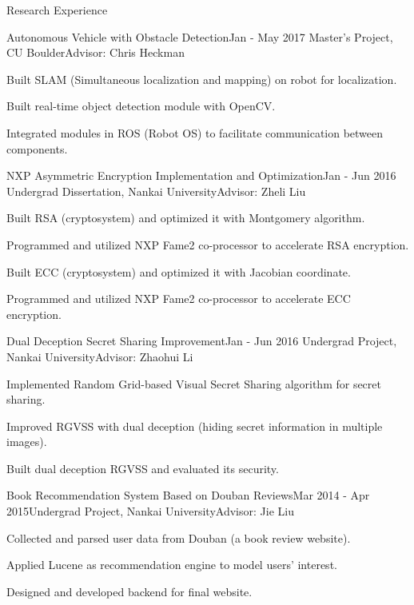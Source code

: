 \documentclass{resume} %
\begin{document}
\begin{rSection}{Research Experience}
\begin{rSubsection}{Autonomous Vehicle with Obstacle Detection}{Jan - May 2017 }{Master's Project, CU Boulder}{Advisor: Chris Heckman}
\item Built SLAM (Simultaneous localization and mapping) on robot for localization.
\item Built real-time object detection module with OpenCV.
\item Integrated modules in ROS (Robot OS) to facilitate communication between components.
\end{rSubsection}

\begin{rSubsection}{NXP Asymmetric Encryption Implementation and Optimization}{Jan - Jun 2016 }{Undergrad Dissertation, Nankai University}{Advisor: Zheli Liu}
\item Built RSA (cryptosystem) and optimized it with Montgomery algorithm.
\item Programmed and utilized NXP Fame2 co-processor to accelerate RSA encryption.
\item Built ECC (cryptosystem) and optimized it with Jacobian coordinate.
\item Programmed and utilized NXP Fame2 co-processor to accelerate ECC encryption.
\end{rSubsection}

\begin{rSubsection}{Dual Deception Secret Sharing Improvement}{Jan - Jun 2016 }{Undergrad Project, Nankai University}{Advisor: Zhaohui Li}
\item Implemented Random Grid-based Visual Secret Sharing algorithm for secret sharing.
\item Improved RGVSS with dual deception (hiding secret information in multiple images).
\item Built dual deception RGVSS and evaluated its security.
\end{rSubsection}

\begin{rSubsection}{Book Recommendation System Based on Douban Reviews}{Mar 2014 - Apr 2015}{Undergrad Project, Nankai University}{Advisor: Jie Liu}
\item Collected and parsed user data from Douban (a book review website).
\item Applied Lucene as recommendation engine to model users' interest.
\item Designed and developed backend for final website.
\end{rSubsection}

\end{rSection}
\end{document}

